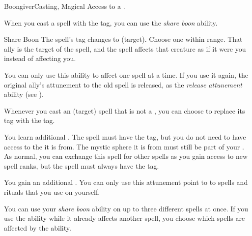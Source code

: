     \begin{feat}{Boongiver}{Casting, Magical}
        \featpre Access to a .

         When you cast a spell with the  tag, you can use the \textit{share boon} ability.
        \begin{activeability}{Share Boon}
            \rankline
            The spell's  tag changes to  (target).
            Choose one  within \rngmed range.
            That ally is the target of the spell, and the spell affects that creature as if it were you instead of affecting you.

            You can only use this ability to affect one spell at a time.
            If you use it again, the original ally's attunement to the old spell is released, as the \textit{release attunement} ability (see ).
        \end{activeability}

         Whenever you cast an  (target) spell that is not a , you can choose to replace its  tag with the  tag.

         You learn additional .
        The spell must have the  tag, but you do not need to have access to the  it is from.
        The mystic sphere it is from must still be part of your .
        As normal, you can exchange this spell for other spells as you gain access to new spell ranks, but the spell must always have the  tag.

         You gain an additional .
        You can only use this attunement point to  to spells and rituals that you use on yourself.

         You can use your \textit{share boon} ability on up to three different spells at once.
        If you use the ability while it already affects another spell, you choose which spells are affected by the ability.
    \end{feat}

